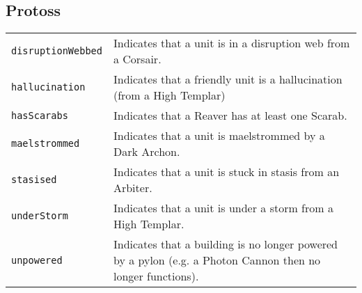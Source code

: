 \subsection{Protoss}
\begin{tabularx}{\textwidth}{lX}
 \verb|disruptionWebbed| & Indicates that a unit is in a disruption web from a Corsair. \\
 \verb|hallucination| & Indicates that a friendly unit is a hallucination (from a High Templar) \\
 \verb|hasScarabs| & Indicates that a Reaver has at least one Scarab. \\
 \verb|maelstrommed| & Indicates that a unit is maelstrommed by a Dark Archon. \\
 \verb|stasised| & Indicates that a unit is stuck in stasis from an Arbiter. \\
 \verb|underStorm| & Indicates that a unit is under a storm from a High Templar. \\
 \verb|unpowered| & Indicates that a building is no longer powered by a pylon (e.g. a Photon Cannon then no longer functions).
\end{tabularx}